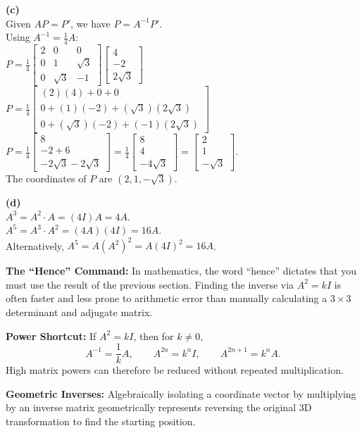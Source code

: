 \begin{solution}
\medskip
\textbf{(c)} \\
Given $AP = P'$, we have $P = A^{-1}P'$. \\
Using $A^{-1} = \frac{1}{4}A$: \\
$P = \frac{1}{4} \begin{bmatrix} 2 & 0 & 0 \\ 0 & 1 & \sqrt{3} \\ 0 & \sqrt{3} & -1 \end{bmatrix} \begin{bmatrix} 4 \\ -2 \\ 2\sqrt{3} \end{bmatrix}$ \\
$P = \frac{1}{4} \begin{bmatrix} (2)(4) + 0 + 0 \\ 0 + (1)(-2) + (\sqrt{3})(2\sqrt{3}) \\ 0 + (\sqrt{3})(-2) + (-1)(2\sqrt{3}) \end{bmatrix}$ \\
$P = \frac{1}{4} \begin{bmatrix} 8 \\ -2 + 6 \\ -2\sqrt{3} - 2\sqrt{3} \end{bmatrix} = \frac{1}{4} \begin{bmatrix} 8 \\ 4 \\ -4\sqrt{3} \end{bmatrix} = \begin{bmatrix} 2 \\ 1 \\ -\sqrt{3} \end{bmatrix}$. \\
The coordinates of $P$ are $(2, 1, -\sqrt{3})$.

\medskip
\textbf{(d)} \\
$A^3 = A^2 \cdot A = (4I)A = 4A$. \\
$A^5 = A^3 \cdot A^2 = (4A)(4I) = 16A$. \\
Alternatively, $A^5 = A(A^2)^2 = A(4I)^2 = 16A$.
\end{solution}

\begin{takeaways}
\item \textbf{The ``Hence'' Command:} In mathematics, the word ``hence'' dictates that you must use the result of the previous section. Finding the inverse via $A^2 = kI$ is often faster and less prone to arithmetic error than manually calculating a $3 \times 3$ determinant and adjugate matrix.
\item \textbf{Power Shortcut:} If $A^2=kI$, then for $k\neq0$,
\[
A^{-1}=\frac1kA,\qquad
A^{2n}=k^nI,\qquad
A^{2n+1}=k^nA.
\]
High matrix powers can therefore be reduced without repeated multiplication.
\item \textbf{Geometric Inverses:} Algebraically isolating a coordinate vector by multiplying by an inverse matrix geometrically represents reversing the original 3D transformation to find the starting position.
\end{takeaways}


